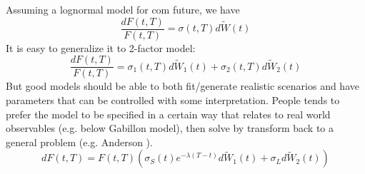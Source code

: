 \documentclass[]{beamer}
\begin{document}
\begin{frame}
  Assuming a lognormal model for com future, we have 
  $$\frac{dF(t,T)}{F(t,T)}=\sigma(t,T)d\tilde{W}(t)$$
  It is easy to generalize it to 2-factor model: 
  $$\frac{dF(t,T)} { F(t,T)}=\sigma_1(t,T)d\tilde{W}_1(t) + \sigma_2(t,T)d\tilde{W}_2(t)$$
  But good models should be able to both fit/generate realistic scenarios and have parameters that can be controlled with some interpretation. People tends to prefer the model to be specified in a certain way that relates to real world observables (e.g. below Gabillon model), then solve by transform back to a general problem (e.g. Anderson ). 
  $$dF(t,T) = F(t,T)(\sigma_S(t) e^{- \lambda (T - t )} d\tilde{W}_1(t) + \sigma_L d\tilde{W}_2(t))$$
\end{frame}
\end{document}
